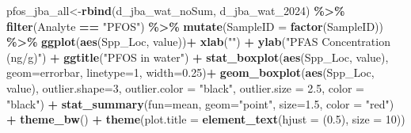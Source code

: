 \documentclass[
]{article}
\newenvironment{Shaded}{\begin{snugshade}}{\end{snugshade}}
\newcommand{\AttributeTok}[1]{\textcolor[rgb]{0.13,0.29,0.53}{#1}}
\newcommand{\DecValTok}[1]{\textcolor[rgb]{0.00,0.00,0.81}{#1}}
\newcommand{\FloatTok}[1]{\textcolor[rgb]{0.00,0.00,0.81}{#1}}
\newcommand{\FunctionTok}[1]{\textcolor[rgb]{0.13,0.29,0.53}{\textbf{#1}}}
\newcommand{\NormalTok}[1]{#1}
\newcommand{\OtherTok}[1]{\textcolor[rgb]{0.56,0.35,0.01}{#1}}
\newcommand{\SpecialCharTok}[1]{\textcolor[rgb]{0.81,0.36,0.00}{\textbf{#1}}}
\newcommand{\StringTok}[1]{\textcolor[rgb]{0.31,0.60,0.02}{#1}}
\begin{document}
\begin{Shaded}
\begin{Highlighting}[]
\NormalTok{pfos\_jba\_all}\OtherTok{\textless{}{-}}\FunctionTok{rbind}\NormalTok{(d\_jba\_wat\_noSum, d\_jba\_wat\_2024) }\SpecialCharTok{\%\textgreater{}\%} 
  \FunctionTok{filter}\NormalTok{(Analyte }\SpecialCharTok{==} \StringTok{"PFOS"}\NormalTok{) }\SpecialCharTok{\%\textgreater{}\%} 
  \FunctionTok{mutate}\NormalTok{(}\AttributeTok{SampleID =} \FunctionTok{factor}\NormalTok{(SampleID)) }\SpecialCharTok{\%\textgreater{}\%} 
  \FunctionTok{ggplot}\NormalTok{(}\FunctionTok{aes}\NormalTok{(Spp\_Loc, value))}\SpecialCharTok{+}
    \FunctionTok{xlab}\NormalTok{(}\StringTok{""}\NormalTok{) }\SpecialCharTok{+}
    \FunctionTok{ylab}\NormalTok{(}\StringTok{"PFAS Concentration (ng/g)"}\NormalTok{) }\SpecialCharTok{+}
    \FunctionTok{ggtitle}\NormalTok{(}\StringTok{"PFOS in water"}\NormalTok{) }\SpecialCharTok{+}
    \FunctionTok{stat\_boxplot}\NormalTok{(}\FunctionTok{aes}\NormalTok{(Spp\_Loc, value),}
                 \AttributeTok{geom=}\StringTok{\textquotesingle{}errorbar\textquotesingle{}}\NormalTok{, }\AttributeTok{linetype=}\DecValTok{1}\NormalTok{, }\AttributeTok{width=}\FloatTok{0.25}\NormalTok{)}\SpecialCharTok{+}
    \FunctionTok{geom\_boxplot}\NormalTok{(}\FunctionTok{aes}\NormalTok{(Spp\_Loc, value),}
                 \AttributeTok{outlier.shape=}\DecValTok{3}\NormalTok{,}
                 \AttributeTok{outlier.color =} \StringTok{"black"}\NormalTok{,}
                 \AttributeTok{outlier.size =} \FloatTok{2.5}\NormalTok{,}
                 \AttributeTok{color =} \StringTok{"black"}\NormalTok{) }\SpecialCharTok{+} 
    \FunctionTok{stat\_summary}\NormalTok{(}\AttributeTok{fun=}\NormalTok{mean, }\AttributeTok{geom=}\StringTok{"point"}\NormalTok{, }\AttributeTok{size=}\FloatTok{1.5}\NormalTok{, }\AttributeTok{color =} \StringTok{"red"}\NormalTok{) }\SpecialCharTok{+}
    \FunctionTok{theme\_bw}\NormalTok{() }\SpecialCharTok{+}
    \FunctionTok{theme}\NormalTok{(}\AttributeTok{plot.title =} \FunctionTok{element\_text}\NormalTok{(}\AttributeTok{hjust =}\NormalTok{ (}\FloatTok{0.5}\NormalTok{), }\AttributeTok{size =} \DecValTok{10}\NormalTok{))}


\end{Highlighting}
\end{Shaded}
\end{document}
